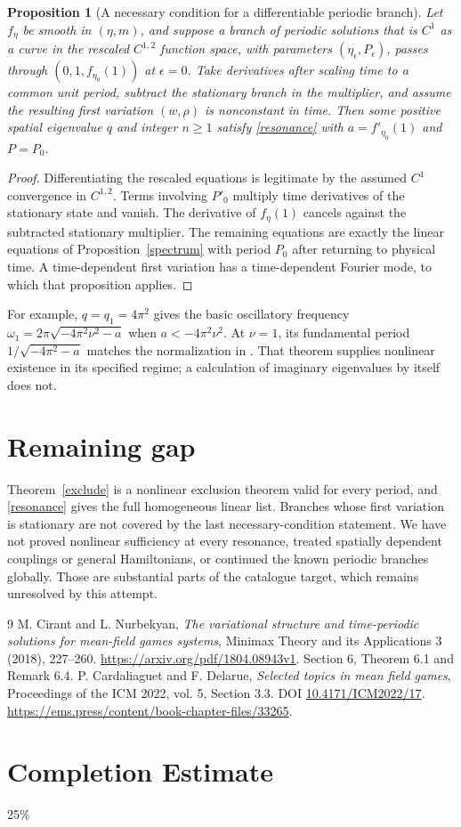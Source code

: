 \documentclass[11pt]{article}
\newtheorem{proposition}[theorem]{Proposition}
\begin{document}
\begin{proposition}[A necessary condition for a differentiable periodic branch]
Let $f_\eta$ be smooth in $(\eta,m)$, and suppose a branch of
periodic solutions that is $C^1$ as a curve in the rescaled $C^{1,2}$
function space, with parameters $(\eta_\epsilon,P_\epsilon)$,
passes through $(0,1,f_{\eta_0}(1))$ at $\epsilon=0$.
Take derivatives after scaling time to a common unit period, subtract the
stationary branch in the multiplier, and assume the resulting first
variation $(w,\rho)$ is nonconstant in time. Then some positive spatial
eigenvalue $q$ and integer $n\geq1$ satisfy \eqref{resonance} with
$a=f'_{\eta_0}(1)$ and $P=P_0$.
\end{proposition}
\begin{proof}
Differentiating the rescaled equations is legitimate by the assumed
$C^1$ convergence in $C^{1,2}$. Terms involving $P'_0$ multiply time
derivatives of the stationary state and vanish. The derivative of
$f_\eta(1)$ cancels against the subtracted stationary multiplier.
The remaining equations are exactly the linear equations of
Proposition~\ref{spectrum} with period $P_0$ after returning to physical
time. A time-dependent first variation has a time-dependent Fourier
mode, to which that proposition applies.
\end{proof}

For example, $q=q_1=4\pi^2$ gives the basic oscillatory frequency
$\omega_1=2\pi\sqrt{-4\pi^2\nu^2-a}$ when $a<-4\pi^2\nu^2$.
At $\nu=1$, its fundamental period
$1/\sqrt{-4\pi^2-a}$ matches the normalization in
\cite[Theorem 6.1]{CN}. That theorem supplies nonlinear existence in
its specified regime; a calculation of imaginary eigenvalues by itself
does not.

\section{Remaining gap}
Theorem~\ref{exclude} is a nonlinear exclusion theorem valid for every
period, and \eqref{resonance} gives the full homogeneous linear list.
Branches whose first variation is stationary are not covered by the last
necessary-condition statement. We have not proved nonlinear sufficiency
at every resonance, treated spatially dependent couplings or general
Hamiltonians, or continued the known periodic branches globally.
Those are substantial parts of the catalogue target, which remains
unresolved by this attempt.

\begin{thebibliography}{9}
 M. Cirant and L. Nurbekyan,
\emph{The variational structure and time-periodic solutions for mean-field games systems},
Minimax Theory and its Applications 3 (2018), 227--260.
\url{https://arxiv.org/pdf/1804.08943v1}. Section 6, Theorem 6.1 and Remark 6.4.
 P. Cardaliaguet and F. Delarue,
\emph{Selected topics in mean field games}, Proceedings of the ICM 2022,
vol. 5, Section 3.3. DOI \href{https://doi.org/10.4171/ICM2022/17}{10.4171/ICM2022/17}.
\url{https://ems.press/content/book-chapter-files/33265}.
\end{thebibliography}
\section{Completion Estimate}
25\%
\end{document}
